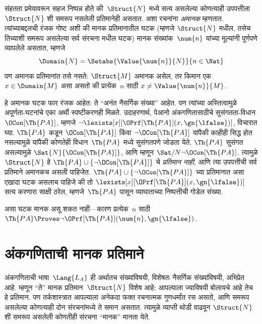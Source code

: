 संहतता प्रमेयावरून सहज निष्पन्न होते की~$\Struct{N}$ मध्ये सत्य असलेल्या
कोणत्याही उपपत्तीला~$\Struct{N}$ शी समरूप नसलेली प्रतिमानेही असतात. अशा
रचनांना \emph{अमानक} म्हणतात. त्यांच्याबद्दलची रंजक गोष्ट अशी की मानक
प्रतिमानातील घटक (म्हणजे $\Struct{N}$ मधील, तसेच तिच्याशी समरूप
असलेल्या सर्व संरचना मधील घटक) मानक संख्यांक~$\num{n}$ यांच्या
मूल्यांनी पूर्णपणे व्यापलेले असतात, म्हणजे
\[\Domain{N} = \Setabs{\Value{\num{n}}{N}}{n \in \Nat}
\]
पण अमानक प्रतिमानांत तसे नसते: $\Struct{M}$ अमानक असेल, तर किमान एक
$x \in \Domain{M}$ असा असतो की प्रत्येक~$n$ साठी
$x \neq \Value{\num{n}}{M}$.

हे अमानक घटक फार रंजक आहेत: ते ``अनंत नैसर्गिक संख्या'' आहेत. पण त्यांच्या
अस्तित्वामुळे अपूर्णता-घटनांचे एका अर्थी स्पष्टीकरणही मिळते. उदाहरणार्थ,
पेआनो अंकगणितासाठीचे सुसंगतता-विधान $\OCon[\Th{PA}]$, म्हणजे $\lnot
\lexists[x][\OPrf[\Th{PA}](x, \gn{\lfalse})]$, विचारात घ्या.
$\Th{PA}$ कडून $\OCon[\Th{PA}]$ किंवा $\lnot \OCon[\Th{PA}]$ यांपैकी
काहीही सिद्ध होत नसल्यामुळे यांपैकी कोणतेही विधान~$\Th{PA}$ मध्ये सुसंगतपणे
जोडता येते. $\Th{PA}$ सुसंगत असल्यामुळे
$\Sat{N}{\OCon[\Th{PA}]}$, आणि म्हणून $\Sat/{N}{\lnot
  \OCon[\Th{PA}]}$. त्यामुळे $\Struct{N}$ हे $\Th{PA}
\cup \{\lnot \OCon[\Th{PA}]\}$ चे \emph{प्रतिमान नाही}, आणि त्या उपपत्तीची
सर्व प्रतिमाने अमानकच असली पाहिजेत. $\Th{PA} \cup \{\lnot
\OCon[\Th{PA}]\}$ च्या प्रतिमानात असा एखादा घटक असलाच पाहिजे की
तो $\lexists[x][\OPrf[\Th{PA}](x, \gn{\lfalse})]$ सत्य करणारा साक्षी
ठरेल, म्हणजे~$\Th{PA}$ पासून व्याघाताच्या निष्पत्तीची गोडेल संख्या.

असा घटक मानक असू शकत नाही---कारण प्रत्येक~$n$ साठी
$\Th{PA} \Proves \lnot \OPrf[\Th{PA}](\num{n}, \gn{\lfalse})$.











\section{अंकगणिताची मानक प्रतिमाने}\label{mod:mar:stm:sec}

अंकगणिताची भाषा~$\Lang{L_A}$ ही अर्थातच संख्यांविषयी, विशेषतः नैसर्गिक
संख्यांविषयी, अभिप्रेत आहे. म्हणून ``ते'' मानक प्रतिमान~$\Struct{N}$ विशेष
आहे: आपल्याला ज्याविषयी बोलायचे आहे तेच हे प्रतिमान. पण तर्कशास्त्रात
आपल्याला अनेकदा फक्त रचनात्मक गुणधर्मांत रस असतो, आणि समरूप असलेल्या कोणत्याही
दोन संरचनांमध्ये ते समान असतात. त्यामुळे व्याप्ती थोडी वाढवून
$\Struct{N}$ शी समरूप असलेली कोणतीही संरचना ``मानक'' मानता येते.

